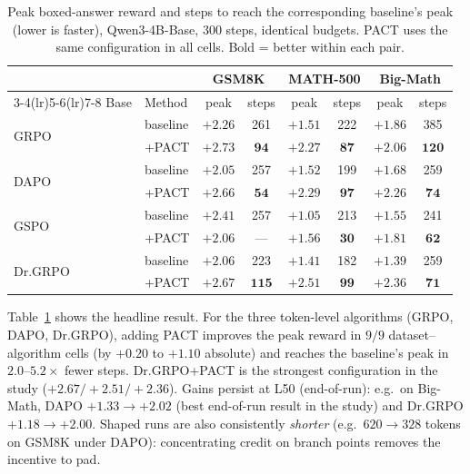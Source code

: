 \documentclass{article} %
\theoremstyle{plain}
\theoremstyle{definition}
\theoremstyle{remark}
\newcommand{\method}{PACT}
\begin{document}
\begin{table}[t]
\caption{Peak boxed-answer reward and steps to reach the corresponding baseline's peak (lower is faster), Qwen3-4B-Base, 300 steps, identical budgets. \method{} uses the same configuration in all cells. Bold = better within each pair.}
\label{tab:main}
\begin{center}
\small
\begin{tabular}{llcccccc}
\toprule
& & \multicolumn{2}{c}{GSM8K} & \multicolumn{2}{c}{MATH-500} & \multicolumn{2}{c}{Big-Math} \\
\cmidrule(lr){3-4}\cmidrule(lr){5-6}\cmidrule(lr){7-8}
Base & Method & peak & steps & peak & steps & peak & steps \\
\midrule
\multirow{2}{*}{GRPO} & baseline & $+2.26$ & 261 & $+1.51$ & 222 & $+1.86$ & 385 \\
 & +\method{} & $\mathbf{+2.73}$ & $\mathbf{94}$ & $\mathbf{+2.27}$ & $\mathbf{87}$ & $\mathbf{+2.06}$ & $\mathbf{120}$ \\
\midrule
\multirow{2}{*}{DAPO} & baseline & $+2.05$ & 257 & $+1.52$ & 199 & $+1.68$ & 259 \\
 & +\method{} & $\mathbf{+2.66}$ & $\mathbf{54}$ & $\mathbf{+2.29}$ & $\mathbf{97}$ & $\mathbf{+2.26}$ & $\mathbf{74}$ \\
\midrule
\multirow{2}{*}{GSPO} & baseline & $\mathbf{+2.41}$ & 257 & $+1.05$ & 213 & $+1.55$ & 241 \\
 & +\method{} & $+2.06$ & --- & $\mathbf{+1.56}$ & $\mathbf{30}$ & $\mathbf{+1.81}$ & $\mathbf{62}$ \\
\midrule
\multirow{2}{*}{Dr.GRPO} & baseline & $+2.06$ & 223 & $+1.41$ & 182 & $+1.39$ & 259 \\
 & +\method{} & $\mathbf{+2.67}$ & $\mathbf{115}$ & $\mathbf{+2.51}$ & $\mathbf{99}$ & $\mathbf{+2.36}$ & $\mathbf{71}$ \\
\bottomrule
\end{tabular}
\end{center}
\end{table}

Table~\ref{tab:main} shows the headline result. For the three token-level algorithms (GRPO, DAPO, Dr.GRPO), adding \method{} improves the peak reward in $9/9$ dataset--algorithm cells (by $+0.20$ to $+1.10$ absolute) and reaches the baseline's peak in $2.0$--$5.2\times$ fewer steps. Dr.GRPO+\method{} is the strongest configuration in the study ($+2.67/+2.51/+2.36$). Gains persist at L50 (end-of-run): e.g.\ on Big-Math, DAPO $+1.33\to+2.02$ (best end-of-run result in the study) and Dr.GRPO $+1.18\to+2.00$. Shaped runs are also consistently \emph{shorter} (e.g.\ $620\to328$ tokens on GSM8K under DAPO): concentrating credit on branch points removes the incentive to pad.
\end{document}
